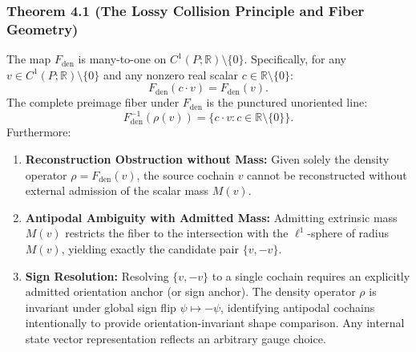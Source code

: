 \documentclass[
  10pt,
]{article}
\begin{document}
\subsubsection{Theorem 4.1 (The Lossy Collision Principle and Fiber Geometry)}\label{theorem-4.1-the-lossy-collision-principle-and-fiber-geometry}

The map \protect\hypertarget{math-E0003-0070}{}{\(F_{\mathrm{den}}\)} is many-to-one on \protect\hypertarget{math-E0061-0071}{}{\(C^1(P; \mathbb{R}) \setminus \{0\}\)}. Specifically, for any \protect\hypertarget{math-E0062-0072}{}{\(v \in C^1(P; \mathbb{R}) \setminus \{0\}\)} and any nonzero real scalar \protect\hypertarget{math-E0063-0073}{}{\(c \in \mathbb{R} \setminus \{0\}\)}: \protect\hypertarget{math-E0064-0074}{}{\[F_{\mathrm{den}}(c \cdot v) = F_{\mathrm{den}}(v).\]} The complete preimage fiber under \protect\hypertarget{math-E0003-0075}{}{\(F_{\mathrm{den}}\)} is the punctured unoriented line: \protect\hypertarget{math-E0065-0076}{}{\[F_{\mathrm{den}}^{-1}(\rho(v)) = \{c \cdot v : c \in \mathbb{R} \setminus \{0\}\}.\]} Furthermore:

\begin{enumerate}
\def\labelenumi{\arabic{enumi}.}
\item
  \textbf{Reconstruction Obstruction without Mass:} Given solely the density operator \protect\hypertarget{math-E0066-0077}{}{\(\rho = F_{\mathrm{den}}(v)\)}, the source cochain \protect\hypertarget{math-E0053-0078}{}{\(v\)} cannot be reconstructed without external admission of the scalar mass \protect\hypertarget{math-E0067-0079}{}{\(M(v)\)}.
\item
  \textbf{Antipodal Ambiguity with Admitted Mass:} Admitting extrinsic mass \protect\hypertarget{math-E0067-0080}{}{\(M(v)\)} restricts the fiber to the intersection with the \protect\hypertarget{math-E0001-0081}{}{\(\ell^1\)}-sphere of radius \protect\hypertarget{math-E0067-0082}{}{\(M(v)\)}, yielding exactly the candidate pair \protect\hypertarget{math-E0068-0083}{}{\(\{v, -v\}\)}.
\item
  \textbf{Sign Resolution:} Resolving \protect\hypertarget{math-E0068-0084}{}{\(\{v, -v\}\)} to a single cochain requires an explicitly admitted orientation anchor (or sign anchor). The density operator \protect\hypertarget{math-E0069-0085}{}{\(\rho\)} is invariant under global sign flip \protect\hypertarget{math-E0070-0086}{}{\(\psi \mapsto -\psi\)}, identifying antipodal cochains intentionally to provide orientation-invariant shape comparison. Any internal state vector representation reflects an arbitrary gauge choice.
\end{enumerate}
\end{document}
